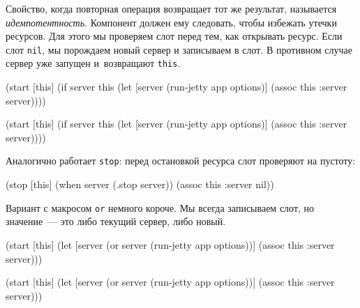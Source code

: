
Свойство, когда повторная операция возвращает тот же результат, называется
\emph{идемпотентность}. Компонент должен ему следовать, чтобы избежать утечки
ресурсов. Для этого мы проверяем слот перед тем, как открывать ресурс. Если слот
\verb|nil|, мы порождаем новый сервер и записываем в слот. В противном случае
сервер уже запущен и~возвращают \verb|this|.

\ifx\DEVICETYPE\MOBILE

\begin{english}
  \begin{clojure}
(start [this]
  (if server
    this
    (let [server (run-jetty
                   app options)]
      (assoc this :server server))))
  \end{clojure}
\end{english}

\else

\begin{english}
  \begin{clojure}
(start [this]
  (if server
    this
    (let [server (run-jetty app options)]
      (assoc this :server server))))
  \end{clojure}
\end{english}

\fi

\noindent
Аналогично работает \verb|stop|: перед остановкой ресурса слот проверяют на
пустоту:

\begin{english}
  \begin{clojure}
(stop [this]
  (when server
    (.stop server))
  (assoc this :server nil))
  \end{clojure}
\end{english}

Вариант с макросом \verb|or| немного короче. Мы всегда записываем слот, но
значение~--- это либо текущий сервер, либо новый.

\ifx\DEVICETYPE\MOBILE

\begin{english}
  \begin{clojure}
(start [this]
  (let [server (or server
                   (run-jetty
                     app options))]
    (assoc this :server server)))
  \end{clojure}
\end{english}

\else

\begin{english}
  \begin{clojure}
(start [this]
  (let [server (or server
                   (run-jetty app options))]
    (assoc this :server server)))
  \end{clojure}
\end{english}


